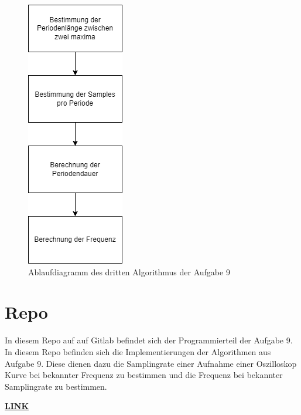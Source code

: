 \begin{figure}
	\centering
	\includegraphics[scale=0.5]{Images/aufgabe9_algo3.png}
	\caption{Ablaufdiagramm des dritten Algorithmus der Aufgabe 9}
	\label{algo3}
\end{figure}

\section{Repo}
In diesem Repo auf auf Gitlab befindet sich der Programmierteil der Aufgabe 9.
In diesem Repo befinden sich die Implementierungen der Algorithmen aus Aufgabe 9.
Diese dienen dazu die Samplingrate einer Aufnahme einer Oszilloskop Kurve bei bekannter Frequenz zu bestimmen und die Frequenz bei bekannter Samplingrate zu bestimmen.\par

\href{https://gitlab.thga.de/daniel.krueger/pruefung_sose_2023_aufgabe_9_algorithmen}{\textbf{LINK}}
